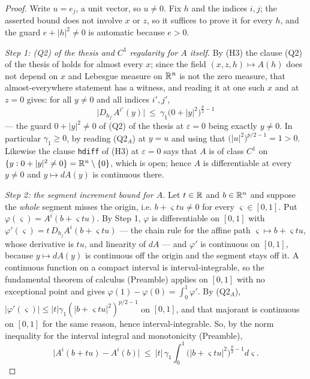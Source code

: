 \begin{proof}
Write $u=e_j$, a unit vector, so $u\ne0$.  Fix $h$ and the indices $i,j$; the
asserted bound does not involve $x$ or $z$, so it suffices to prove it for every
$h$, and the guard $e+|h|^2\ne0$ is automatic because $e>0$.

\emph{Step 1: (Q2) of the thesis and $C^1$ regularity for $A$ itself.}  By (H3) the
clause (Q2) of the thesis of  holds for almost every
$x$; since the field $(x,z,h)\mapsto A(h)$ does not depend on $x$ and Lebesgue
measure on $\mathbb{R}^n$ is not the zero measure, that almost-everywhere statement has
a witness, and reading it at one such $x$ and at $z=0$ gives: for all
$y\ne0$ and all indices $i',j'$,
\[
\bigl|D_{h_{j'}}A^{i'}(y)\bigr|\ \le\ \gamma_1\bigl(0+|y|^2\bigr)^{\frac p2-1}
\tag{Q2$_A$}
\]
--- the guard $0+|y|^2\ne0$ of (Q2) of the thesis at $\varepsilon=0$ being exactly
$y\ne0$.  In particular $\gamma_1\ge0$, by reading (Q2$_A$) at $y=u$ and using
that $\bigl(|u|^2\bigr)^{p/2-1}=1>0$.  Likewise the clause \texttt{hdiff} of
(H3) at $\varepsilon=0$ says that $A$ is of class $C^1$ on
$\{y:0+|y|^2\ne0\}=\mathbb{R}^n\setminus\{0\}$, which is open; hence $A$ is
differentiable at every $y\ne0$ and $y\mapsto dA(y)$ is continuous there.

\emph{Step 2: the segment increment bound for $A$.}  Let $t\in\mathbb{R}$ and
$b\in\mathbb{R}^n$ and suppose the \emph{whole} segment misses the origin, i.e.
$b+\varsigma tu\ne0$ for every $\varsigma\in[0,1]$.  Put
$\varphi(\varsigma)=A^i(b+\varsigma tu)$.  By Step 1, $\varphi$ is
differentiable on $[0,1]$ with
$\varphi'(\varsigma)=t\,D_{h_j}A^i(b+\varsigma tu)$ --- the chain rule for the
affine path $\varsigma\mapsto b+\varsigma tu$, whose derivative is $tu$, and
linearity of $dA$ --- and $\varphi'$ is continuous on $[0,1]$, because
$y\mapsto dA(y)$ is continuous off the origin and the segment stays off it.  A
continuous function on a compact interval is interval-integrable, so the
fundamental theorem of calculus (Preamble) applies on $[0,1]$ with no
exceptional point and gives $\varphi(1)-\varphi(0)=\int_0^1\varphi'$.  By
(Q2$_A$), $|\varphi'(\varsigma)|\le|t|\gamma_1(|b+\varsigma tu|^2)^{p/2-1}$ on
$[0,1]$, and that majorant is continuous on $[0,1]$ for the same reason, hence
interval-integrable.  So, by the norm inequality for the interval integral and
monotonicity (Preamble),
\[
\bigl|A^i(b+tu)-A^i(b)\bigr|
\ \le\ |t|\,\gamma_1\int_0^1\bigl(|b+\varsigma tu|^2\bigr)^{\frac p2-1}d\varsigma .
\tag{IA}
\]


\end{proof}
